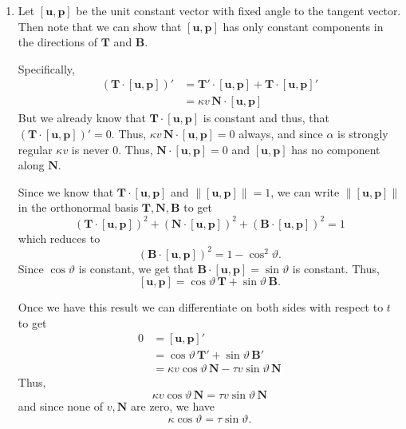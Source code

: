 \documentclass[12 pt, letterpaper]{hmcpset}
\begin{document}
\begin{solution}
	\begin{enumerate}
		\item	Let $[\mathbf{u}, \mathbf{p}]$ be the unit constant vector with fixed angle to the tangent vector. Then note that we can show that $[\mathbf{u}, \mathbf{p}]$ has only constant components in the directions of $\mathbf{T}$ and $\mathbf{B}$. 

			Specifically,
			\[
				\begin{split}
					(\mathbf{T} \cdot [\mathbf{u}, \mathbf{p}])' & = \mathbf{T}' \cdot [\mathbf{u}, \mathbf{p}] + \mathbf{T} \cdot [\mathbf{u}, \mathbf{p}]' \\
										     & = \kappa v \, \mathbf{N} \cdot [\mathbf{u}, \mathbf{p}]
				\end{split}
			\]
			But we already know that $\mathbf{T} \cdot [\mathbf{u}, \mathbf{p}]$ is constant and thus, that $(\mathbf{T} \cdot [\mathbf{u}, \mathbf{p}])' = 0$. Thus, $\kappa v \, \mathbf{N} \cdot [\mathbf{u}, \mathbf{p}] = 0$ always, and since $\alpha$ is strongly regular $\kappa v$ is never $0$. Thus, $\mathbf{N} \cdot [\mathbf{u}, \mathbf{p}] = 0$ and $[\mathbf{u}, \mathbf{p}]$ has no component along $\mathbf{N}$. 

			Since we know that $\mathbf{T} \cdot [\mathbf{u}, \mathbf{p}]$ and $\lVert [\mathbf{u}, \mathbf{p}] \rVert = 1$, we can write $\lVert [\mathbf{u}, \mathbf{p}] \rVert$ in the orthonormal basis $\mathbf{T}, \mathbf{N}, \mathbf{B}$ to get
			\[
				(\mathbf{T} \cdot [\mathbf{u}, \mathbf{p}])^{2} + (\mathbf{N} \cdot [\mathbf{u}, \mathbf{p}])^{2} + (\mathbf{B} \cdot [\mathbf{u}, \mathbf{p}])^{2} = 1
			\]
			which reduces to
			\[
				(\mathbf{B} \cdot [\mathbf{u}, \mathbf{p}])^{2} = 1 - \cos^{2}{\vartheta}.
			\]
			Since $\cos{\vartheta}$ is constant, we get that $\mathbf{B} \cdot [\mathbf{u}, \mathbf{p}] = \sin{\vartheta}$ is constant. Thus,
			\[
				[\mathbf{u}, \mathbf{p}] = \cos{\vartheta} \, \mathbf{T} + \sin{\vartheta} \, \mathbf{B}.
			\] 

			Once we have this result we can differentiate on both sides with respect to $t$ to get
			\[
				\begin{split}
					0 & = [\mathbf{u}, \mathbf{p}]' \\
					  & = \cos{\vartheta} \, \mathbf{T}' + \sin{\vartheta} \, \mathbf{B}' \\
					  & = \kappa v \cos{\vartheta} \, \mathbf{N} - \tau v \sin{\vartheta} \, \mathbf{N}
				\end{split}
			\]
			Thus,
			\[
				\kappa v \cos{\vartheta} \, \mathbf{N} = \tau v \sin{\vartheta} \, \mathbf{N}
			\]
			and since none of $v, \mathbf{N}$ are zero, we have
			\[
				\kappa \cos{\vartheta} = \tau \sin{\vartheta}.
			\] 


\end{enumerate}
\end{solution}
\end{document}
